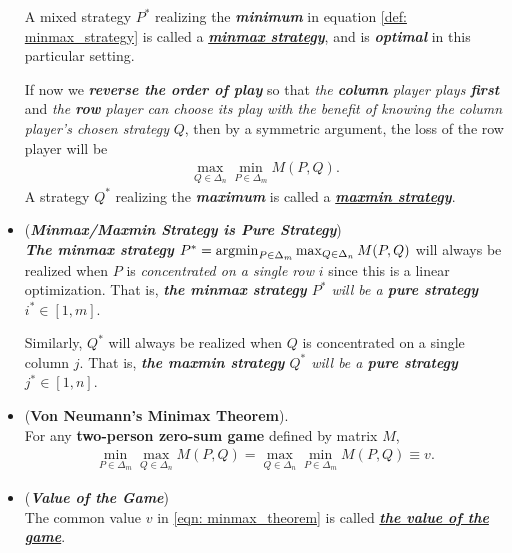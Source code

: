 \documentclass[11pt]{article}
\begin{document}
\begin{itemize}
\begin{definition}
A mixed strategy $P^{*}$ realizing the \emph{\textbf{minimum}} in equation \eqref{def: minmax_strategy} is called a \underline{\emph{\textbf{minmax strategy}}}, and is \emph{\textbf{optimal}} in this particular setting.

If now we \emph{\textbf{reverse the order of play}} so that \emph{the \textbf{column} player plays \textbf{first}} and \emph{the \textbf{row} player can choose its play with the benefit of knowing the column player’s chosen strategy} $Q$, then by a symmetric argument, the loss of the row player will be
\begin{align}
\max_{Q \in \Delta_{n}}\min_{P \in \Delta_{m}}M(P, Q). \label{def: minmax_strategy_reverse}
\end{align} A strategy $Q^{*}$ realizing the \emph{\textbf{maximum}} is called a \underline{\emph{\textbf{maxmin strategy}}}.
\end{definition}

\item \begin{remark}(\textbf{\emph{Minmax/Maxmin Strategy is Pure Strategy}}) \\
\emph{\textbf{The minmax strategy}} $P^{*} = \operatorname{argmin}_{P \in \Delta_{m}} \max_{Q \in \Delta_{n}}M(P, Q)$ will always be realized when $P$ is
\emph{concentrated on a single row} $i$ since this is a linear optimization. That is, \emph{\textbf{the minmax strategy} $P^{*}$ will be a \textbf{pure strategy} $i^{*} \in [1, m]$}.

Similarly, $Q^{*}$ will always be realized when $Q$ is concentrated on a single column $j$. That is,  \emph{\textbf{the maxmin strategy} $Q^{*}$ will be a \textbf{pure strategy} $j^{*} \in [1, n]$}.
\end{remark}

\item \begin{theorem} (\textbf{Von Neumann's Minimax Theorem}). \citep{schapire2012boosting, mohri2018foundations} \\
For any \textbf{two-person zero-sum game} defined by matrix $M$,
\begin{align}
\min_{P \in \Delta_{m}}\max_{Q \in \Delta_{n}}M(P, Q) = \max_{Q \in \Delta_{n}}\min_{P \in \Delta_{m}}M(P, Q) \equiv v. \label{eqn: minmax_theorem}
\end{align} 
\end{theorem}

\item \begin{remark}(\textbf{\emph{Value of the Game}})\\
The common value $v$ in \eqref{eqn: minmax_theorem} is called \underline{\emph{\textbf{the value of the game}}}. 


\end{remark}
\end{itemize}
\end{document}
